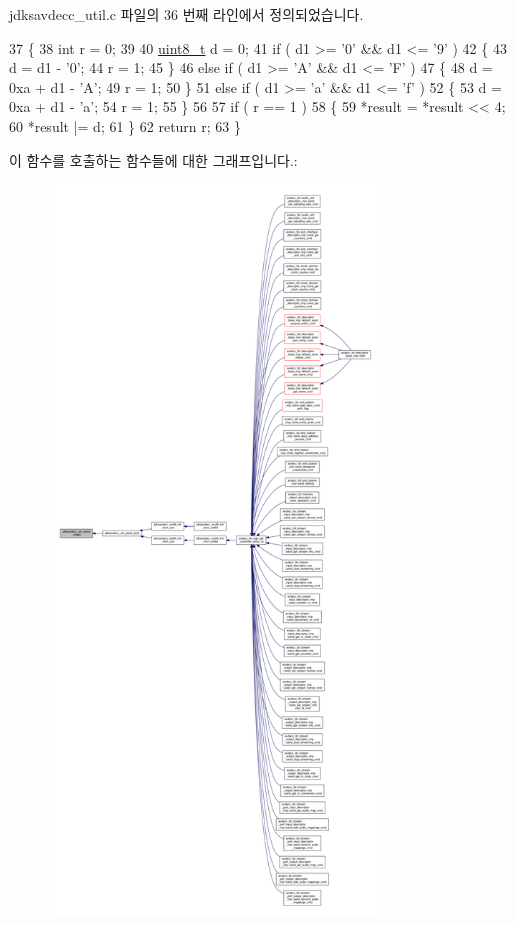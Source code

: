 jdksavdecc\+\_\+util.\+c 파일의 36 번째 라인에서 정의되었습니다.


\begin{DoxyCode}
37 \{
38     \textcolor{keywordtype}{int} r = 0;
39 
40     \hyperlink{stdint_8h_aba7bc1797add20fe3efdf37ced1182c5}{uint8\_t} d = 0;
41     \textcolor{keywordflow}{if} ( d1 >= \textcolor{charliteral}{'0'} && d1 <= \textcolor{charliteral}{'9'} )
42     \{
43         d = d1 - \textcolor{charliteral}{'0'};
44         r = 1;
45     \}
46     \textcolor{keywordflow}{else} \textcolor{keywordflow}{if} ( d1 >= \textcolor{charliteral}{'A'} && d1 <= \textcolor{charliteral}{'F'} )
47     \{
48         d = 0xa + d1 - \textcolor{charliteral}{'A'};
49         r = 1;
50     \}
51     \textcolor{keywordflow}{else} \textcolor{keywordflow}{if} ( d1 >= \textcolor{charliteral}{'a'} && d1 <= \textcolor{charliteral}{'f'} )
52     \{
53         d = 0xa + d1 - \textcolor{charliteral}{'a'};
54         r = 1;
55     \}
56 
57     \textcolor{keywordflow}{if} ( r == 1 )
58     \{
59         *result = *result << 4;
60         *result |= d;
61     \}
62     \textcolor{keywordflow}{return} r;
63 \}
\end{DoxyCode}


이 함수를 호출하는 함수들에 대한 그래프입니다.\+:
\nopagebreak
\begin{figure}[H]
\begin{center}
\leavevmode
\includegraphics[height=550pt]{group__util_ga8e6b4707f16031adcb7ae2f983e908ee_icgraph}
\end{center}
\end{figure}


